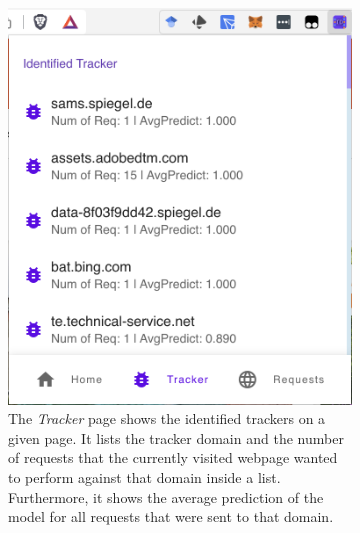 \begin{figure}[ht!]
  \hfill
  \begin{subfigure}[b]{.30\textwidth}
      \centering
      \includegraphics[width=\linewidth, keepaspectratio]{images/Tracker.png}
      \caption{The \emph{Tracker} page shows the identified trackers on a given page. It lists the tracker domain and 
      the number of requests that the currently visited webpage wanted to perform against that domain inside a list. Furthermore, it shows
    the average prediction of the model for all requests that were sent to that domain.}
      \label{fig:Tracker}
  \end{subfigure}
  \hfill
  \begin{subfigure}[b]{.30\textwidth}
      \centering

\end{subfigure}
\end{figure}
